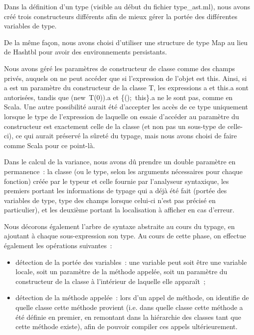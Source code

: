 \documentclass[a4paper,10pt]{article}
\newcommand{\code}[1]{{\fontfamily{pcr}\selectfont #1}}
\begin{document}
Dans la définition d'un type (visible au début du fichier
\code{type\_{}ast.ml}), nous avons créé trois constructeurs différents
afin de mieux gérer la portée des différentes variables de type.

De la même façon, nous avons choisi d'utiliser une structure de type
\code{Map} au lieu de \code{Hashtbl} pour avoir des environnements
persistants.

Nous avons géré les paramètres de constructeur de classe comme des
champs privés, auquels on ne peut accéder que si l'expression de
l'objet est \code{this}. Ainsi, si \code{a} est un paramètre du
constructeur de la classe T, les expressions \code{a} et \code{this.a}
sont autorisées, tandis que \code{(new~T(0)).a} et
\code{\{();~this\}.a} ne le sont pas, comme en Scala. Une autre
possibilité aurait été d'accepter les accès de ce type uniquement
lorsque le type de l'expression de laquelle on essaie d'accéder au
paramètre du constructeur est exactement celle de la classe (et non
pas un sous-type de celle-ci), ce qui aurait préservé la sûreté du
typage, mais nous avons choisi de faire comme Scala pour ce point-là.

Dans le calcul de la variance, nous avons dû prendre un double
paramètre en permanence~: la classe (ou le type, selon les arguments
nécessaires pour chaque fonction) créée par le typeur et celle fournie
par l'analyseur syntaxique, les premiers portant les informations de
typage qui a déjà été fait (portée des variables de type, type des
champs lorsque celui-ci n'est pas précisé en particulier), et les
deuxième portant la localisation à afficher en cas d'erreur.

Nous décorons également l'arbre de syntaxe abstraite au cours du
typage, en ajoutant à chaque sous-expression son type. Au cours de
cette phase, on effectue également les opérations suivantes~:
\begin{itemize}
\item{détection de la portée des variables~: une variable peut soit
    être une variable locale, soit un paramètre de la méthode appelée,
  soit un paramètre du constructeur de la classe à l'intérieur de
  laquelle elle apparaît~;}
\item{détection de la méthode appelée~: lors d'un appel de méthode, on
    identifie de quelle classe cette méthode provient (i.e. dans
    quelle classe cette méthode a été définie en premier, en remontant
    dans la hiérarchie des classes tant que cette méthode existe),
    afin de pouvoir compiler ces appels ultérieurement.}
\end{itemize}
\end{document}
